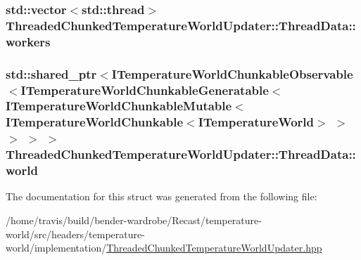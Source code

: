 \hypertarget{struct_threaded_chunked_temperature_world_updater_1_1_thread_data_a9007df155da319c2c0d22950a32151e1}{
\subsubsection[{workers}]{\setlength{\rightskip}{0pt plus 5cm}std\-::vector$<$std\-::thread$>$ Threaded\-Chunked\-Temperature\-World\-Updater\-::\-Thread\-Data\-::workers}}\label{struct_threaded_chunked_temperature_world_updater_1_1_thread_data_a9007df155da319c2c0d22950a32151e1}
\hypertarget{struct_threaded_chunked_temperature_world_updater_1_1_thread_data_acc751ecf3ebda6bb89a20917380453de}{
\subsubsection[{world}]{\setlength{\rightskip}{0pt plus 5cm}std\-::shared\-\_\-ptr$<${\bf I\-Temperature\-World\-Chunkable\-Observable}$<${\bf I\-Temperature\-World\-Chunkable\-Generatable}$<${\bf I\-Temperature\-World\-Chunkable\-Mutable}$<${\bf I\-Temperature\-World\-Chunkable}$<${\bf I\-Temperature\-World}$>$ $>$ $>$ $>$ $>$ Threaded\-Chunked\-Temperature\-World\-Updater\-::\-Thread\-Data\-::world}}\label{struct_threaded_chunked_temperature_world_updater_1_1_thread_data_acc751ecf3ebda6bb89a20917380453de}


The documentation for this struct was generated from the following file\-:\begin{DoxyCompactItemize}
\item 
/home/travis/build/bender-\/wardrobe/\-Recast/temperature-\/world/src/headers/temperature-\/world/implementation/\hyperlink{_threaded_chunked_temperature_world_updater_8hpp}{Threaded\-Chunked\-Temperature\-World\-Updater.\-hpp}\end{DoxyCompactItemize}
